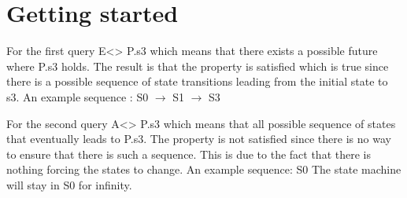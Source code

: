 \section{Getting started}
\label{sec:org7b4758c}

For the first query E<> P.s3 which means that there exists a possible future where P.s3 holds. The result is that the property is satisfied which is true since there is a possible sequence of state transitions leading from the initial state to s3.
An example sequence : S0 $\rightarrow$ S1 $\rightarrow$ S3

For the second query A<> P.s3 which means that all possible sequence of states that eventually leads to P.s3. The property is not satisfied since there is no way to ensure that there is such a sequence. This is due to the fact that there is nothing forcing the states to change.
An example sequence: S0     The state machine will stay in S0 for infinity. 

